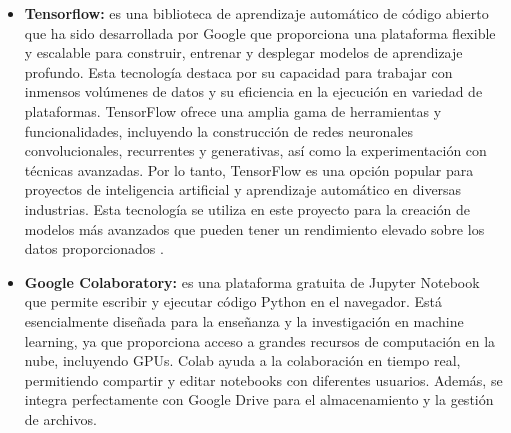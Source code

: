 \begin{itemize}
  \item \textbf{Tensorflow:}
  es una biblioteca de aprendizaje automático de código abierto que ha sido desarrollada por Google que proporciona una plataforma flexible y escalable para construir, entrenar y desplegar modelos de aprendizaje profundo. Esta tecnología destaca por su capacidad para trabajar con inmensos volúmenes de datos y su eficiencia en la ejecución en variedad de plataformas. TensorFlow ofrece una amplia gama de herramientas y funcionalidades, incluyendo la construcción de redes neuronales convolucionales, recurrentes y generativas, así como la experimentación con técnicas avanzadas. Por lo tanto, TensorFlow es una opción popular para proyectos de inteligencia artificial y aprendizaje automático en diversas industrias. Esta tecnología se utiliza en este proyecto para la creación de modelos más avanzados que pueden tener un rendimiento elevado sobre los datos proporcionados \cite{tensorflow}.
  \item \textbf{Google Colaboratory:}
  es una plataforma gratuita de Jupyter Notebook que permite escribir y ejecutar código Python en el navegador. Está esencialmente diseñada para la enseñanza y la investigación en machine learning, ya que proporciona acceso a grandes recursos de computación en la nube, incluyendo GPUs. Colab ayuda a la colaboración en tiempo real, permitiendo compartir y editar notebooks con diferentes usuarios. Además, se integra perfectamente con Google Drive para el almacenamiento y la gestión de archivos.
  
  
  \end{itemize}
